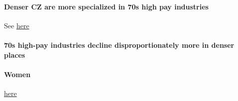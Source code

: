 \paragraph{Denser CZ are more specialized in 70s high pay industries}


See \href{https://www.dropbox.com/s/dwse5a96c5xl2xx/high_pay_ind_density_full_time.png?dl=0}{here}

\paragraph{70s high-pay industries decline disproportionately more in denser places}


\paragraph{Women }
\href{https://www.dropbox.com/s/dwse5a96c5xl2xx/high_pay_ind_density_full_time.png?dl=0}{here}



